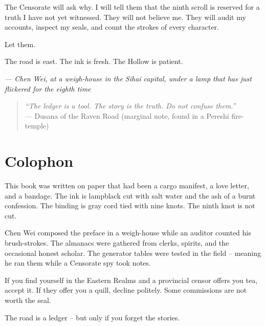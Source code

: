 \documentclass[12pt,oneside]{book}
\begin{document}
The Censorate will ask why. I will tell them that the ninth scroll is reserved for a truth I have not yet witnessed. They will not believe me. They will audit my accounts, inspect my seals, and count the strokes of every character.

Let them.

The road is east. The ink is fresh. The Hollow is patient.

\vspace{1em}
\noindent\textit{--- Chen Wei, at a weigh-house in the Sihai capital, under a lamp that has just flickered for the eighth time}

\vspace{2em}
\begin{quote}
  \small
  \textit{``The ledger is a tool. The story is the truth. Do not confuse them.''} \\
  --- Dusana of the Raven Road (marginal note, found in a Pereshi fire-temple)
\end{quote}

\chapter*{Colophon}

This book was written on paper that had been a cargo manifest, a love letter, and a bandage. The ink is lampblack cut with salt water and the ash of a burnt confession. The binding is gray cord tied with nine knots. The ninth knot is not cut.

Chen Wei composed the preface in a weigh-house while an auditor counted his brush-strokes. The almanacs were gathered from clerks, spirits, and the occasional honest scholar. The generator tables were tested in the field -- meaning he ran them while a Censorate spy took notes.

If you find yourself in the Eastern Realms and a provincial censor offers you tea, accept it. If they offer you a quill, decline politely. Some commissions are not worth the seal.

The road is a ledger -- but only if you forget the stories.
\end{document}
